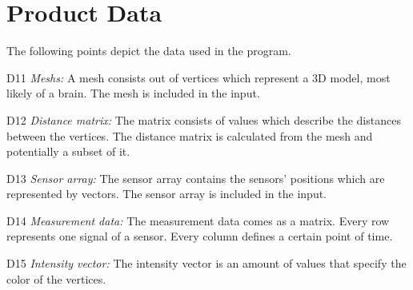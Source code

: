 \section{Product Data}
The following points depict the data used in the program.
	\begin{aims}
		\item[D11] \textit{Meshs:} A mesh consists out of vertices which represent a 3D model, most likely of a brain. The mesh is included in the input.
		
		\item[D12] \textit{Distance matrix:} The matrix consists of values which describe the distances between the vertices. The distance matrix is calculated from the mesh and potentially a subset of it.
		
		\item[D13] \textit{Sensor array:} The sensor array contains the sensors' positions which are represented by vectors. The sensor array is included in the input.
		
		\item[D14] \textit{Measurement data:} The measurement data comes as a matrix. Every row represents one signal of a sensor. Every column defines a certain point of time.
		
		\item[D15] \textit{Intensity vector:} The intensity vector is an amount of values that specify the color of the vertices.
	\end{aims}